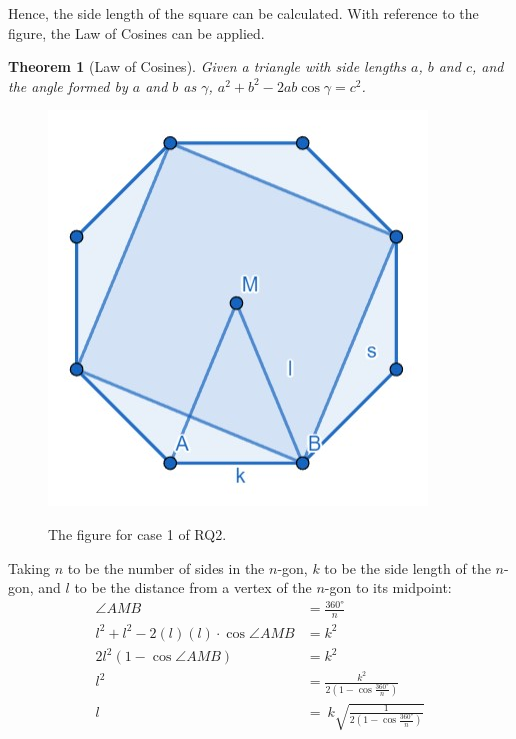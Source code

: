 \documentclass[12pt]{scrartcl}
\newtheorem{theorem}{Theorem}[section]
\begin{document}
Hence, the side length of the square can be calculated.
With reference to the figure, the Law of Cosines can be applied.

\begin{theorem}[Law of Cosines]
	Given a triangle with side lengths $a$, $b$ and $c$, and the angle formed by $a$
	and $b$ as $\gamma$, $a^2 + b^2 - 2ab \cos \gamma = c^2$.
\end{theorem}

\begin{figure}[htpb]
	\centering
	\includegraphics[scale=.75]{images/rq2_1_2.jpg}
	\label{fig:rq2_1_2_img}
	\caption{The figure for case 1 of RQ2.}
\end{figure}

Taking $n$ to be the number of sides in the $n$-gon, $k$ to be the side length
of the $n$-gon, and $l$ to be the distance from a vertex of the $n$-gon to its midpoint:
\begin{align*}
	\angle{AMB}                                               & = \frac{\ang{360}}{n}                                          \\
	l^2+l^2-2\left(l\right)\left(l\right)\cdot\cos\angle{AMB} & =k^{2}                                                         \\
	2l^2\left(1-\cos\angle{AMB}\right)                        & =k^{2}                                                         \\
	l^2                                                       & =\frac{k^{2}}{2\left(1-\cos{\frac{\ang{360}}{n}}\right)}       \\
	l                                                         & =\ k\sqrt{\frac{1}{2\left(1-\cos{\frac{\ang{360}}{n}}\right)}} \\
\end{align*}
\end{document}
